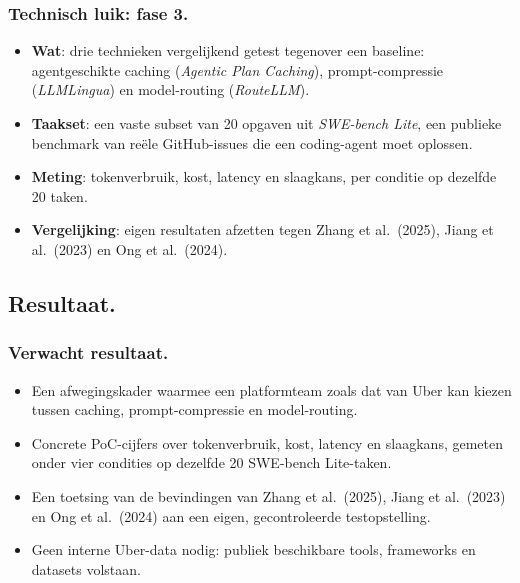\documentclass[aspectratio=169]{beamer}
\begin{document}
\begin{frame}
	\frametitle{Technisch luik: fase 3.}
     \begin{itemize}
        \item \textbf{Wat}: drie technieken vergelijkend getest tegenover
            een baseline: agentgeschikte caching (\emph{Agentic Plan
            Caching}), prompt-compressie (\emph{LLMLingua}) en
            model-routing (\emph{RouteLLM}).
        \item \textbf{Taakset}: een vaste subset van 20 opgaven uit
            \emph{SWE-bench Lite}, een publieke benchmark van reële
            GitHub-issues die een coding-agent moet oplossen.
        \item \textbf{Meting}: tokenverbruik, kost, latency en slaagkans,
            per conditie op dezelfde 20 taken.
        \item \textbf{Vergelijking}: eigen resultaten afzetten tegen
            Zhang et al.\ (2025), Jiang et al.\ (2023) en Ong et
            al.\ (2024).
    \end{itemize}
\end{frame}

\subsection{Resultaat.}

\begin{frame}
    \frametitle{Verwacht resultaat.}

   \begin{itemize}
        \item Een afwegingskader waarmee een platformteam zoals dat van
            Uber kan kiezen tussen caching, prompt-compressie en
            model-routing.
        \item Concrete PoC-cijfers over tokenverbruik, kost, latency en
            slaagkans, gemeten onder vier condities op dezelfde 20
            SWE-bench Lite-taken.
        \item Een toetsing van de bevindingen van Zhang et al.\ (2025),
            Jiang et al.\ (2023) en Ong et al.\ (2024) aan een eigen,
            gecontroleerde testopstelling.
        \item Geen interne Uber-data nodig: publiek beschikbare tools,
            frameworks en datasets volstaan.
    \end{itemize}
\end{frame}

\end{document}
